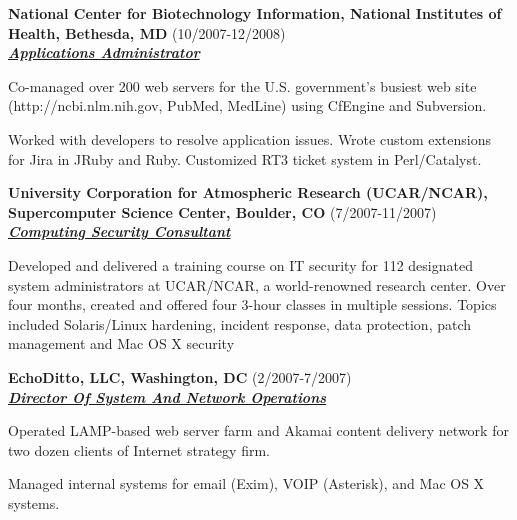\documentclass{article}
\newcommand{\employer}[3]{{ \textbf{#1} (#2)\\ \underline{\textbf{\emph{#3}}}\\ \nopagebreak }}
\newenvironment{achievements}{\begin{list}{\topsep 0pt \itemsep -2pt}} {\vspace*{4pt}\end{list}}
\begin{document}
\employer{National Center for Biotechnology Information, National Institutes of Health, Bethesda, MD}{10/2007-12/2008}{Applications Administrator}
\begin{achievements}
   \item Co-managed over 200 web servers for the U.S. government's busiest web site (http://ncbi.nlm.nih.gov, PubMed, MedLine) using CfEngine and Subversion.
   \item Worked with developers to resolve application issues.  Wrote custom extensions for Jira in JRuby and Ruby.  Customized RT3 ticket system in Perl/Catalyst.
\end{achievements}

\employer{University Corporation for Atmospheric Research (UCAR/NCAR), Supercomputer Science Center, Boulder, CO}{7/2007-11/2007}{Computing Security Consultant}
\begin{achievements}
\item Developed and delivered a training course on IT security for 112 designated system administrators at UCAR/NCAR, a world-renowned research center.  Over four months, created and offered four 3-hour classes in multiple sessions. Topics included Solaris/Linux hardening, incident response, data protection, patch management and Mac OS X security
\end{achievements}

\employer{EchoDitto, LLC, Washington, DC}{2/2007-7/2007}{Director Of System And Network Operations}
\begin{achievements}
  \item Operated LAMP-based web server farm and Akamai content delivery network for two dozen clients of Internet strategy firm.
  \item Managed internal systems for email (Exim), VOIP (Asterisk), and Mac OS X systems.
\end{achievements}
\end{document}

